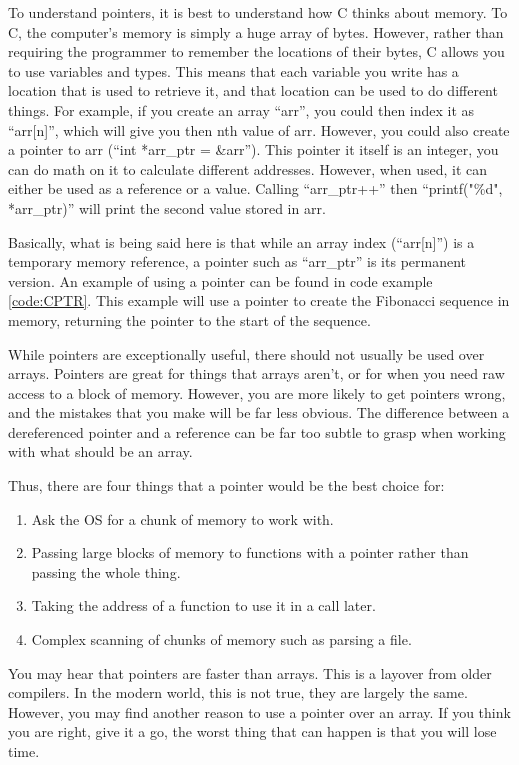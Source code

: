 			To understand pointers, it is best to understand how C thinks about memory. 
			To C, the computer's memory is simply a huge array of bytes. 
			However, rather than requiring the programmer to remember the locations of their bytes, C allows you to use variables and types. 
			This means that each variable you write has a location that is used to retrieve it, and that location can be used to do different things. 
			For example, if you create an array ``arr'', you could then index it as ``arr[n]'', which will give you then nth value of arr. 
			However, you could also create a pointer to arr (``int *arr\_ptr = \&arr''). 
			This pointer it itself is an integer, you can do math on it to calculate different addresses. 
			However, when used, it can either be used as a reference or a value. 
			Calling ``arr\_ptr++'' then ``printf("\%d", *arr\_ptr)'' will print the second value stored in arr. 

			Basically, what is being said here is that while an array index (``arr[n]'') is a temporary memory reference, a pointer such as ``arr\_ptr'' is its permanent version. 
			An example of using a pointer can be found in code example \ref{code:CPTR}. 
			This example will use a pointer to create the Fibonacci sequence in memory, returning the pointer to the start of the sequence. 
			\begin{code}
				C}]{./CPointers.c}
				\caption{Example of a C Pointers}
				\label{code:CPTR}
			\end{code}

			While pointers are exceptionally useful, there should not usually be used over arrays. 
			Pointers are great for things that arrays aren't, or for when you need raw access to a block of memory. 
			However, you are more likely to get pointers wrong, and the mistakes that you make will be far less obvious. 
			The difference between a dereferenced pointer and a reference can be far too subtle to grasp when working with what should be an array. 

			Thus, there are four things that a pointer would be the best choice for:
			\begin{enumerate}
				\item Ask the OS for a chunk of memory to work with. 
				\item Passing large blocks of memory to functions with a pointer rather than passing the whole thing. 
				\item Taking the address of a function to use it in a call later. 
				\item Complex scanning of chunks of memory such as parsing a file. 
			\end{enumerate}
			You may hear that pointers are faster than arrays. 
			This is a layover from older compilers. 
			In the modern world, this is not true, they are largely the same. 
			However, you may find another reason to use a pointer over an array. 
			If you think you are right, give it a go, the worst thing that can happen is that you will lose time. 

